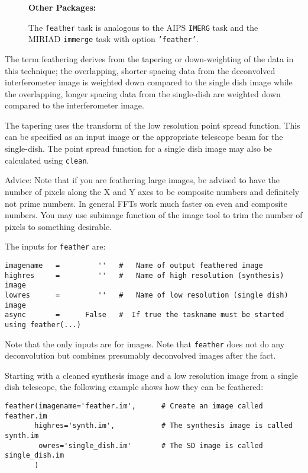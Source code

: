 \begin{wrapfigure}{r}{2.5in}
  \begin{boxedminipage}{2.5in}
     \centerline{\bf Other Packages:}
     The {\tt feather} task is analogous to the AIPS {\tt IMERG} 
     task and the MIRIAD {\tt immerge} task with option 
     {\tt 'feather'}.
  \end{boxedminipage}
\end{wrapfigure}
The term feathering derives from the tapering or down-weighting of the
data in this technique; the overlapping, shorter spacing data from the
deconvolved interferometer image is weighted down compared to the
single dish image while the overlapping, longer spacing data from the
single-dish are weighted down compared to the interferometer image.

The tapering uses the transform of the low resolution point spread
function. This can be specified as an input image or the appropriate
telescope beam for the single-dish.  The point spread function for a
single dish image may also be calculated using {\tt clean}.

Advice: Note that if you are feathering large images, be advised to
have the number of pixels along the X and Y axes to be composite
numbers and definitely not prime numbers. In general FFTs work much
faster on even and composite numbers. You may use subimage function of
the image tool to trim the number of pixels to something desirable.

The inputs for {\tt feather} are:
\small
\begin{verbatim}
imagename   =         ''   #   Name of output feathered image
highres     =         ''   #   Name of high resolution (synthesis) image
lowres      =         ''   #   Name of low resolution (single dish) image
async       =      False   #  If true the taskname must be started using feather(...)
\end{verbatim}
\normalsize
Note that the only inputs are for images.
Note that {\tt feather} does not do any deconvolution but combines presumably
deconvolved images after the fact.

Starting with a cleaned synthesis image and a low resolution image
from a single dish telescope, the following example shows how they
can be feathered:
\small
\begin{verbatim}
feather(imagename='feather.im',      # Create an image called feather.im
       highres='synth.im',           # The synthesis image is called synth.im
        owres='single_dish.im'       # The SD image is called single_dish.im
       )
\end{verbatim}
\normalsize

